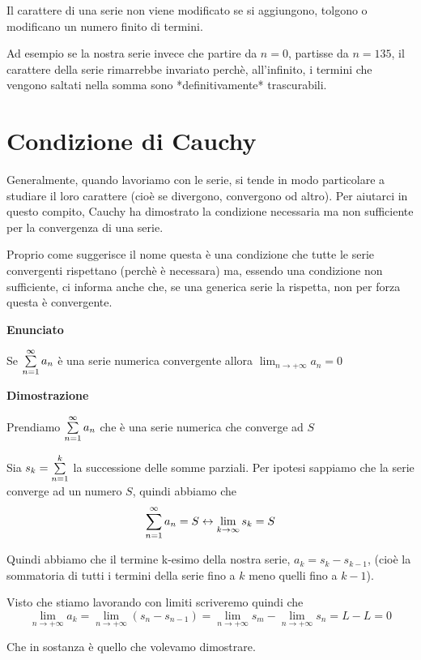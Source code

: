 Il carattere di una serie non viene modificato se si aggiungono, tolgono o modificano un numero finito di termini.

\begin{tip}
Ad esempio se la nostra serie invece che partire da $n=0$, partisse da $n=135$, il carattere della serie rimarrebbe invariato perchè, all'infinito, i termini che vengono saltati nella somma sono *definitivamente* trascurabili.
\end{tip}

\section{Condizione di Cauchy}

Generalmente, quando lavoriamo con le serie, si tende in modo particolare a studiare il loro carattere (cioè se divergono, convergono od altro). Per aiutarci in questo compito, Cauchy ha dimostrato la condizione necessaria ma non sufficiente per la convergenza di una serie. 

\begin{tip}
Proprio come suggerisce il nome questa è una condizione che tutte le serie convergenti rispettano (perchè è necessara) ma, essendo una condizione non sufficiente, ci informa anche che, se una generica serie la rispetta, non per forza questa è convergente.  
\end{tip}

\textbf{Enunciato}

Se $\sum\limits_{n=1}^{\infty}a_n$ è una serie numerica convergente allora $\lim_{n \to +\infty}a_n = 0$


\textbf{Dimostrazione}

Prendiamo $\sum\limits_{n=1}^{\infty}a_n$ che è una serie numerica che converge ad $S$

Sia $s_k = \sum\limits_{n=1}^{k}$ la successione delle somme parziali. Per ipotesi sappiamo che la serie converge ad un numero $S$, quindi abbiamo che $$\sum\limits_{n=1}^{\infty}a_n=S \leftrightarrow \lim_{k \to \infty} s_k = S$$

Quindi abbiamo che il termine k-esimo della nostra serie, $a_k = s_k - s_{k-1}$, (cioè la sommatoria di tutti i termini della serie fino a $k$ meno quelli fino a $k-1$).   

Visto che stiamo lavorando con limiti scriveremo  quindi che $$\lim_{n \to +\infty} a_k = \lim_{n \to +\infty} (s_n - s_{n-1}) = \lim_{n \to +\infty} s_m - \lim_{n \to +\infty} s_n = L - L = 0  $$

Che in sostanza è quello che volevamo dimostrare.


